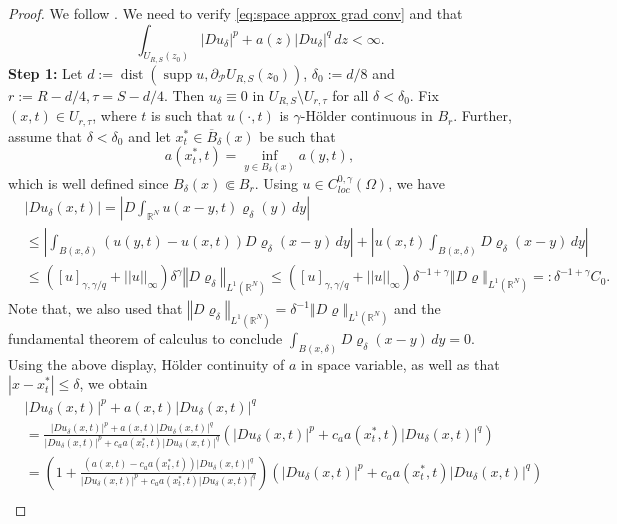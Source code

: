 \documentclass[notitlepage,11pt,reqno]{amsart}
\theoremstyle{definition}
\numberwithin{equation}{section}
\newcommand{\RR}{\mathds{R}}
\DeclareMathOperator*{\supp}{supp}
\begin{document}
\begin{proof} We follow \cite[Theorem 3.2]{SS25}. We need to verify \eqref{eq:space approx grad conv} and that
\[\int_{U_{R, S}(z_0)}|Du_{\delta}|^p+a(z)|Du_{\delta}|^q\, dz< \infty.\]
\textbf{Step 1:} Let $d:=\operatorname{dist}(\supp u,\partial_{\mathcal{P}} U_{R, S}(z_0))$, $\delta_{0}:=d/8$
and $r:=R-d/4, \tau=S-d/4$. Then $u_{\delta}\equiv0$ in $U_{R, S}\setminus U_{r, \tau}$
for all $\delta<\delta_{0}$. Fix $(x,t)\in U_{r, \tau}$, where $t$ is such that $u(\cdot, t)$ is $\gamma$-H\"{o}lder continuous in $B_r.$ Further, assume that $\delta<\delta_{0}$ and let $x_{t}^{\ast}\in\overline{B}_{\delta}(x)$
be such that 
\[
a(x_{t}^{\ast},t)=\inf_{y\in B_{\delta}(x)}a(y,t),
\]
which is well defined since $B_{\delta}(x)\Subset B_{r}.$ Using $u \in C^{0, \gamma}_{loc}(\Omega)$, we have
\begin{align*}
&\left|Du_{\delta}(x,t)\right|=\left|D\int_{\RR^{N}}u\left(x-y,t\right)\varrho_{\delta}(y)\, dy\right|\\
& \leq \left|\int_{B(x, \delta)}\left(u(y,t)-u(x,t)\right)D\varrho_{\delta}(x-y)\,dy\right|+\left|u(x, t)\int_{B(x, \delta)}D\varrho_{\delta}(x-y)\, dy\right|\\
 & \leq([u]_{\gamma, \gamma/q}+||u||_{\infty})\delta^{\gamma}\left\Vert D\varrho_{\delta}\right\Vert _{L^{1}(\RR^{N})}\leq([u]_{\gamma, \gamma/q}+||u||_{\infty})\delta^{-1+\gamma}\left\Vert D\varrho\right\Vert _{L^{1}(\RR^{N})}=:\delta^{-1+\gamma}C_{0}.
\end{align*}
Note that,  we also used that $\left\Vert D\varrho_{\delta}\right\Vert _{L^{1}(\RR^{N})}=\delta^{-1}\left\Vert D\varrho\right\Vert _{L^{1}(\RR^{N})}$ and the fundamental theorem of calculus to conclude $\int_{B(x, \delta)}D\varrho_{\delta}(x-y)\, dy=0.$
Using the above display, H\"{o}lder continuity of $a$ in space variable,
as well as that $\left|x-x_{t}^{\ast}\right|\leq\delta$, we obtain
\begin{align*}
 & \left|Du_{\delta}(x,t)\right|^{p}+a(x,t)\left|Du_{\delta}(x,t)\right|^{q}\nonumber \\
 & =\frac{\left|Du_{\delta}(x,t)\right|^{p}+a(x,t)\left|Du_{\delta}(x,t)\right|^{q}}{\left|Du_{\delta}(x,t)\right|^{p}+c_a a(x_{t}^{\ast},t)\left|Du_{\delta}(x,t)\right|^{q}}\left(\left|Du_{\delta}(x,t)\right|^{p}+c_a a(x^{\ast}_t,t)\left|Du_{\delta}(x,t)\right|^{q}\right)\nonumber \\
 & =\left(1+\frac{(a(x,t)-c_ a a(x_{t}^{\ast},t))\left|Du_{\delta}(x,t)\right|^{q}}{\left|Du_{\delta}(x,t)\right|^{p}+c_a a(x_{t}^{\ast},t)\left|Du_{\delta}(x,t)\right|^{q}}\right)\left(\left|Du_{\delta}(x,t)\right|^{p}+c_a a(x^{\ast}_t,t)\left|Du_{\delta}(x,t)\right|^{q}\right)\nonumber \\

\end{align*}
\end{proof}
\end{document}
